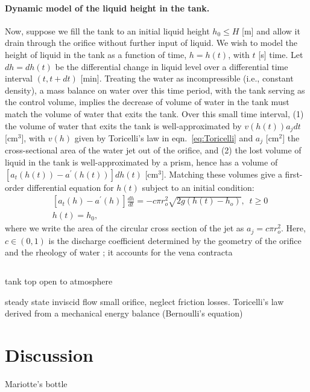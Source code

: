 \documentclass[openacc]{rsproca_new}%
\begin{document}
\paragraph{Dynamic model of the liquid height in the tank.} Now, suppose we fill the tank to an initial liquid height $h_0 \leq H$ [m] and allow it drain through the orifice without further input of liquid. We wish to model the height of liquid in the tank as a function of time, $h=h(t)$, with $t$ [s] time. 
Let $dh=dh(t)$ be the differential change in liquid level over a differential time interval $(t, t+dt)$ [min]. 
Treating the water as incompressible (i.e., constant density), a mass balance on water over this time period, with the tank serving as the control volume, implies the decrease of volume of water in the tank must match the volume of water that exits the tank.
Over this small time interval, (1) the volume of water that exits the tank is well-approximated by $v(h(t)) a_{j} dt$ [cm$^3$], with $v(h)$ given by Toricelli's law in eqn.~\ref{eq:Toricelli} and $a_j$ [cm$^2$] the cross-sectional area of the water jet out of the orifice, and (2) the lost volume of liquid in the tank is well-approximated by a prism, hence has a volume of $[a_t(h(t))-a^\prime(h(t))]dh(t)$ [cm$^3$]. Matching these volumes give a first-order differential equation for $h(t)$ subject to an initial condition:
\begin{align}
& [a_t(h)-a^\prime(h)]\frac{dh}{dt}= -c \pi r_o^2 \sqrt{2g (h(t)-h_o)}, \,\,\, t \geq 0 \\
& h(t)=h_0,
\end{align}
where we write the area of the circular cross section of the jet as $a_j=c \pi r_o^2$.
Here, $c\in(0,1)$ \cite{lienhard1984velocity,hicks2014determining,wadhwa2021study} is the discharge coefficient determined by the geometry of the orifice and the rheology of water \cite{teoman2022discharge}; it accounts for the vena contracta

\begin{equation}
\end{equation}

tank top open to atmosphere

steady state inviscid flow
small orifice, neglect friction losses.
Toricelli's law derived from a mechanical energy balance (Bernoulli's equation) \cite{teoman2022discharge}

\section{Discussion}

Mariotte's bottle \cite{kirevs2006mariotte}

\enlargethispage{20pt}




\vskip2pc



\end{document}
